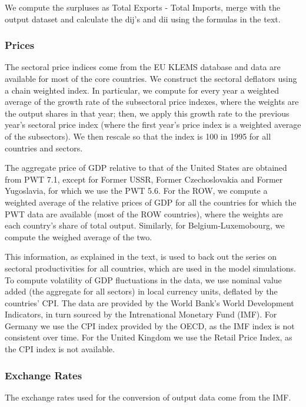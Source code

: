 \documentclass[12pt]{article}
\begin{document}
We compute the surpluses as Total Exports - Total Imports, merge with the
output dataset and calculate the dij's and dii using the formulas in the
text.

\subsubsection{Prices}

The sectoral price indices come from the EU KLEMS database and data are
available for most of the core countries. We construct the sectoral
deflators using a chain weighted index. In particular, we compute for every
year a weighted average of the growth rate of the subsectoral price indexes,
where the weights are the output shares in that year; then, we apply this
growth rate to the previous year's sectoral price index (where the first
year's price index is a weighted average of the subsectors). We then rescale
so that the index is 100 in 1995 for all countries and sectors.

The aggregate price of GDP relative to that of the United States are
obtained from PWT 7.1, except for Former USSR, Former Czechoslovakia and
Former Yugoslavia, for which we use the PWT 5.6. For the ROW, we compute a
weighted average of the relative prices of GDP for all the countries for
which the PWT data are available (most of the ROW countries), where the
weights are each country's share of total output. Similarly, for
Belgium-Luxemobourg, we compute the weighed average of the two.

This information, as explained in the text, is used to back out the series
on sectoral productivities for all countries, which are used in the model
simulations. To compute volatility of GDP fluctuations in the data, we use
nominal value added (the aggregate for all sectors) in local currency units,
deflated by the countries' CPI. The data are provided by the World Bank's
World Development Indicators, in turn sourced by the Intrenational Monetary
Fund (IMF). For Germany we use the CPI index provided by the OECD, as the
IMF index is not consistent over time. For the United Kingdom we use the
Retail Price Index, as the CPI index is not available.

\subsubsection{Exchange Rates}

The exchange rates used for the conversion of output data come from the IMF.
\end{document}
